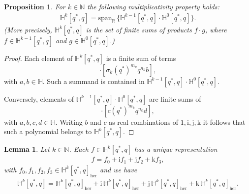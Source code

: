 \documentclass[11pt,a4paper]{amsart}
\newtheorem{lemma}[theorem]{Lemma}
\newtheorem{proposition}[theorem]{Proposition}
\theoremstyle{definition}
\begin{document}
\begin{proposition}
\label{prop4.8}
For $k\in \mathbb{N}$ the following multiplicativity property holds:
%
\begin{align}
\label{multprop}
\mathbb{H}^{k}[q^{*}, q] ={\mathrm{span}}_{\mathbb{R}}\, \{\mathbb{H}^{k-1}[q^{*},
q] \cdot \mathbb{H}^{0}[q^{*}, q]\}.
\end{align}
%
(More precisely, $\mathbb{H}^{k}[q^{*}, q]$ is the set of finite sums of
products $f\cdot g$, where $f\in \mathbb{H}^{k-1}[q^{*}, q]$ and
$g\in \mathbb{H}^{0}[q^{*}, q]$.)
\end{proposition}
%
\begin{proof}
Each element of $ \mathbb{H}^{k}[q^{*}, q] $ is a finite sum of terms
%
\begin{equation*}
[a(q^{*})^{m_{0}} q^{n_{0}} \sigma _{1}(q^{*})^{m_{1}} q^{n_{1}}
\cdots (q^{*})^{m_{k-1}} q^{n_{k-1}}]\cdot [\sigma _{k}(q^{*})^{m_{k}}
q^{n_{k}}b],
\end{equation*}with $a,b\in \mathbb{H}$. Such a summand is contained in
$ \mathbb{H}^{k-1}[q^{*}, q] \cdot \mathbb{H}^{0}[q^{*}, q]$.

Conversely, elements of
$ \mathbb{H}^{k-1}[q^{*}, q] \cdot \mathbb{H}^{0}[q^{*}, q]$ are finite
sums of
%
\begin{equation*}
[a(q^{*})^{m_{0}} q^{n_{0}} \sigma _{1}(q^{*})^{m_{1}} q^{n_{1}}
\cdots (q^{*})^{m_{k-1}} q^{n_{k-1}}b]\cdot [c (q^{*})^{m_{k}} q^{n_{k}}d],
\end{equation*}
%
with $a,b,c,d\in \mathbb{H}$. Writing $b$ and $c$ as real combinations
of $1,\mathrm{i},\mathrm{j},\mathrm{k}$ it follows that such a polynomial
belongs to $\mathbb{H}^{k}[q^{*}, q]$.
\end{proof}
%
\begin{lemma}%
\label{frep}
Let $k\in \mathbb{N}$. Each $f\in \mathbb{H}^{k}[q^{*},q]$ has a unique
representation
%
\begin{align}
\label{frepresentation}
f=f_{0}+\mathrm{i}f_{1}+\mathrm{j}f_{2}+\mathrm{k}f_{3},
\end{align}
%
with
$f_{0}, f_{1},f_{2},f_{3}\in \mathbb{H}^{k}[q^{*},q]_{\mathrm{her}}$ and
we have
%
\begin{align}
\label{dechk}
\mathbb{H}^{k}[q^{*},q]=\mathbb{H}^{k}[q^{*},q]_{\mathrm{her}}+
\mathrm{i}\, \mathbb{H}^{k}[q^{*},q]_{\mathrm{her}}+\mathrm{j}\,
\mathbb{H}^{k}[q^{*},q]_{\mathrm{her}}+\mathrm{k}\, \mathbb{H}^{k}[q^{*},q]_{
\mathrm{her}}.
\end{align}
%
\end{lemma}
\end{document}
